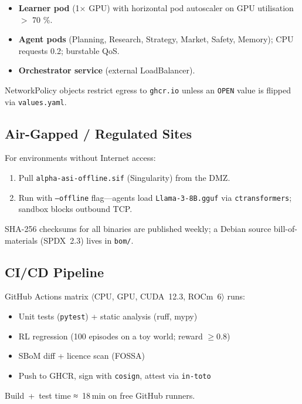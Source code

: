 \begin{itemize}
  \item \textbf{Learner pod} (1× GPU) with horizontal pod autoscaler on GPU utilisation~$>$ 70 \%.
  \item \textbf{Agent pods} (Planning, Research, Strategy, Market, Safety, Memory); CPU requests 0.2; burstable QoS.
  \item \textbf{Orchestrator service} (external LoadBalancer).
\end{itemize}

NetworkPolicy objects restrict egress to \texttt{ghcr.io} unless an \texttt{OPEN} value is flipped via \texttt{values.yaml}.

\subsection{Air-Gapped / Regulated Sites}

For environments without Internet access:

\begin{enumerate}[label=\alph*)]
  \item Pull \texttt{alpha-asi-offline.sif} (Singularity) from the DMZ.
  \item Run with \texttt{--offline} flag—agents load \texttt{Llama-3-8B.gguf} via \texttt{ctransformers}; sandbox blocks outbound TCP.
\end{enumerate}

SHA-256 checksums for all binaries are published weekly;
a Debian source bill-of-materials (SPDX 2.3) lives in \texttt{bom/}.

\subsection{CI/CD Pipeline}

GitHub Actions matrix $\langle$CPU, GPU, CUDA 12.3, ROCm 6$\rangle$ runs:

\begin{itemize}
  \item Unit tests (\texttt{pytest}) + static analysis (ruff, mypy)
  \item RL regression (100 episodes on a toy world; reward $\ge 0.8$)
  \item SBoM diff + licence scan (FOSSA)
  \item Push to GHCR, sign with \texttt{cosign}, attest via \texttt{in-toto}
\end{itemize}

Build + test time ≈ 18 min on free GitHub runners.

